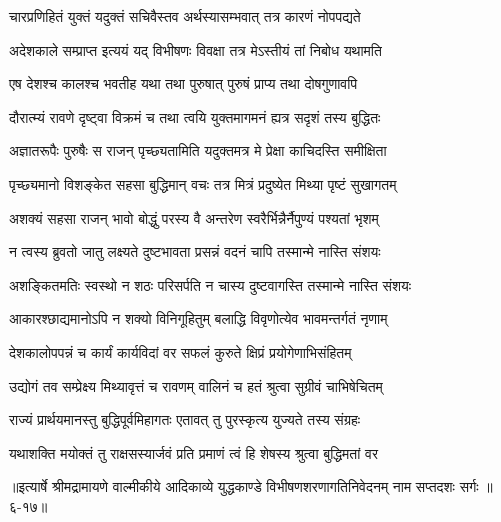 \twolineshloka
{चारप्रणिहितं युक्तं यदुक्तं सचिवैस्तव}
{अर्थस्यासम्भवात् तत्र कारणं नोपपद्यते} %

\twolineshloka
{अदेशकाले सम्प्राप्त इत्ययं यद् विभीषणः}
{विवक्षा तत्र मेऽस्तीयं तां निबोध यथामति} %

\twolineshloka
{एष देशश्च कालश्च भवतीह यथा तथा}
{पुरुषात् पुरुषं प्राप्य तथा दोषगुणावपि} %

\twolineshloka
{दौरात्म्यं रावणे दृष्ट्वा विक्रमं च तथा त्वयि}
{युक्तमागमनं ह्यत्र सदृशं तस्य बुद्धितः} %

\twolineshloka
{अज्ञातरूपैः पुरुषैः स राजन् पृच्छ्यतामिति}
{यदुक्तमत्र मे प्रेक्षा काचिदस्ति समीक्षिता} %

\twolineshloka
{पृच्छ्यमानो विशङ्केत सहसा बुद्धिमान् वचः}
{तत्र मित्रं प्रदुष्येत मिथ्या पृष्टं सुखागतम्} %

\twolineshloka
{अशक्यं सहसा राजन् भावो बोद्धुं परस्य वै}
{अन्तरेण स्वरैर्भिन्नैर्नैपुण्यं पश्यतां भृशम्} %

\twolineshloka
{न त्वस्य ब्रुवतो जातु लक्ष्यते दुष्टभावता}
{प्रसन्नं वदनं चापि तस्मान्मे नास्ति संशयः} %

\twolineshloka
{अशङ्कितमतिः स्वस्थो न शठः परिसर्पति}
{न चास्य दुष्टवागस्ति तस्मान्मे नास्ति संशयः} %

\twolineshloka
{आकारश्छाद्यमानोऽपि न शक्यो विनिगूहितुम्}
{बलाद्धि विवृणोत्येव भावमन्तर्गतं नृणाम्} %

\twolineshloka
{देशकालोपपन्नं च कार्यं कार्यविदां वर}
{सफलं कुरुते क्षिप्रं प्रयोगेणाभिसंहितम्} %

\twolineshloka
{उद्योगं तव सम्प्रेक्ष्य मिथ्यावृत्तं च रावणम्}
{वालिनं च हतं श्रुत्वा सुग्रीवं चाभिषेचितम्} %

\twolineshloka
{राज्यं प्रार्थयमानस्तु बुद्धिपूर्वमिहागतः}
{एतावत् तु पुरस्कृत्य युज्यते तस्य संग्रहः} %

\twolineshloka
{यथाशक्ति मयोक्तं तु राक्षसस्यार्जवं प्रति}
{प्रमाणं त्वं हि शेषस्य श्रुत्वा बुद्धिमतां वर} %


॥इत्यार्षे श्रीमद्रामायणे वाल्मीकीये आदिकाव्ये युद्धकाण्डे विभीषणशरणागतिनिवेदनम् नाम सप्तदशः सर्गः ॥६-१७॥

